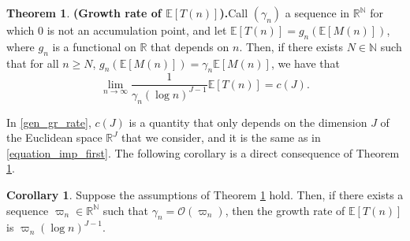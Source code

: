\documentclass[12pt, reqno]{amsart}
\theoremstyle{definition}
\newtheorem{theorem}{Theorem}%
\newtheorem{corollary}{Corollary}[theorem]
\begin{document}
\begin{theorem}{\textbf{(Growth rate of $\mathbb{E}[T(n)]$).}}\label{extrema2}
Call $(\gamma_n)$ a sequence in $\mathbb{R}^\mathbb{N}$ for which $0$ is not an accumulation point, and let $\mathbb{E}[T(n)]=g_n(\mathbb{E}[M(n)])$, where $g_n$ is a functional on $\mathbb{R}$ that depends on $n$. Then, if there exists $N\in\mathbb{N}$ such that for all $n\geq N$, $g_n(\mathbb{E}[M(n)])=\gamma_n \mathbb{E}[M(n)]$, we have that
\begin{equation}\label{gen_gr_rate}
\lim_{n \rightarrow \infty} \frac{1}{{\gamma_n} (\log n)^{J-1}} \mathbb{E}[T(n)] =  c(J).
\end{equation}
\end{theorem}


In \eqref{gen_gr_rate}, $c(J)$ is a quantity that only depends on the dimension $J$ of the Euclidean space $\mathbb{R}^J$ that we consider, and it is the same as in \eqref{equation_imp_first}. The following corollary is a direct consequence of Theorem \ref{extrema2}.

\begin{corollary}\label{extrema2_cor}
Suppose the assumptions of Theorem \ref{extrema2} hold. Then, if there exists a sequence $\varpi_n \in \mathbb{R}^\mathbb{N}$ such that $\gamma_n=\mathcal{O}(\varpi_n)$, then the growth rate of $\mathbb{E}[T(n)]$ is $\varpi_n(\log n)^{J-1}$.
\end{corollary}








\end{document}
